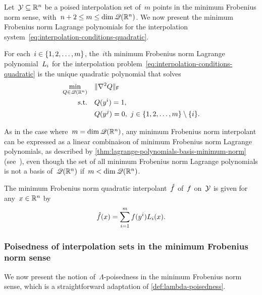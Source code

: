 Let~$\xpt \subseteq \R^n$ be a poised interpolation set of~$m$ points in the minimum Frobenius norm sense, with~$n + 2 \le m \le \dim \mathscr{Q}(\mathbb{R}^n)$.
We now present the minimum Frobenius norm Lagrange polynomials for the interpolation system~\cref{eq:interpolation-conditions-quadratic}.

\begin{definition}
    \label{def:lagrange-polynomials-minimum-norm}
    For each~$i \in \{1, 2, \dots, m\}$, the~$i$th minimum Frobenius norm Lagrange polynomial~$\lagp[i]$ for the interpolation problem~\cref{eq:interpolation-conditions-quadratic} is the unique quadratic polynomial that solves
    \begin{align*}
        \min_{Q \in \mathscr{Q}(\mathbb{R}^n)} & \quad \lVert\nabla^2 Q\rVert_{\mathsf{F}}\\
        \text{s.t.}         & \quad Q(y^i) = 1,\\
                            & \quad Q(y^j) = 0, ~ j \in \{1, 2, \dots, m\} \setminus \{i\}.
    \end{align*}
\end{definition}

As in the case where~$m = \dim \mathscr{Q}(\mathbb{R}^n)$, any minimum Frobenius norm interpolant can be expressed as a linear combinaison of minimum Frobenius norm Lagrange polynomials, as described by \cref{thm:lagrange-polynomials-basis-minimum-norm} (see~\cite[\S~3]{Powell_2004b}), even though the set of all minimum Frobenius norm Lagrange polynomials is not a basis of~$\mathscr{Q}(\mathbb{R}^n)$ if~$m < \dim \mathscr{Q}(\mathbb{R}^n)$.

\begin{theorem}
    \label{thm:lagrange-polynomials-basis-minimum-norm}
    The minimum Frobenius norm quadratic interpolant~$\objm$ of~$f$ on~$\xpt$ is given for any~$\iter \in \R^n$ by
    \begin{equation*}
        \objm(\iter) = \sum_{i = 1}^m \obj(y^i) \lagp[i](\iter).
    \end{equation*}
\end{theorem}

\subsubsection{Poisedness of interpolation sets in the minimum Frobenius norm sense}

We now present the notion of~$\Lambda$-poisedness in the minimum Frobenius norm sense, which is a straightforward adaptation of \cref{def:lambda-poisedness}.

